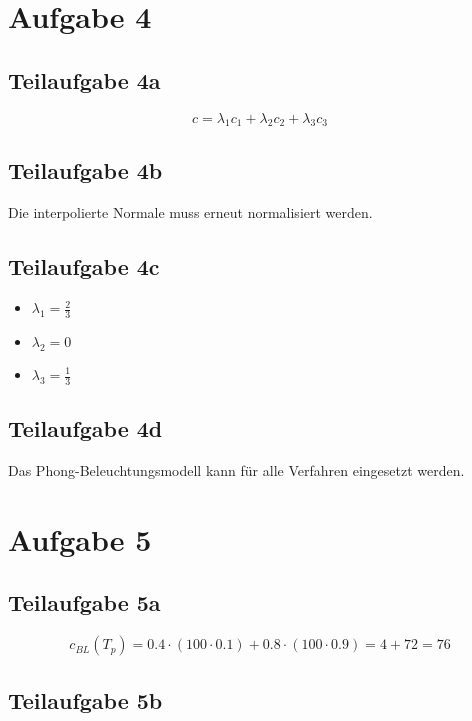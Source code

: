 \documentclass[a4paper]{scrartcl}
\begin{document}
\section*{Aufgabe 4}
\subsection*{Teilaufgabe 4a}
\[c = \lambda_1 c_1 + \lambda_2 c_2 + \lambda_3 c_3\]

\subsection*{Teilaufgabe 4b}
Die interpolierte Normale muss erneut normalisiert werden.

\subsection*{Teilaufgabe 4c}
\begin{itemize}
	\item $\lambda_1 = \frac{2}{3}$
	\item $\lambda_2 = 0$
	\item $\lambda_3 = \frac{1}{3}$
\end{itemize}

\subsection*{Teilaufgabe 4d}
Das Phong-Beleuchtungsmodell kann für alle Verfahren eingesetzt werden.


\section*{Aufgabe 5}
\subsection*{Teilaufgabe 5a}
\[c_{BL}(T_p) = 0.4 \cdot (100 \cdot 0.1) + 0.8 \cdot (100 \cdot 0.9) = 4 + 72 = 76\]

\subsection*{Teilaufgabe 5b}
\end{document}
